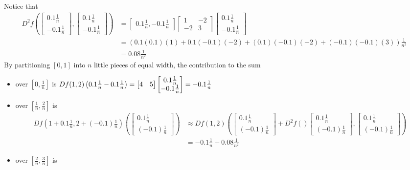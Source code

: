 \documentclass{article}
\newcommand{\verticalvector}[1]{\begin{bmatrix}#1\end{bmatrix}}
\newenvironment{question}{}{}
\newenvironment{hint}{}{}
\newenvironment{solution}{}{}
\begin{document}
\begin{question}
  \begin{solution}
    \begin{hint}
      Notice that \begin{align*}
        D^2f\left(\verticalvector{0.1\frac{1}{n}\\-0.1\frac{1}{n}},\verticalvector{0.1\frac{1}{n}\\-0.1\frac{1}{n}}\right)
        &=\begin{bmatrix} 0.1 \frac{1}{n}, -0.1\frac{1}{n}\end{bmatrix}  \begin{bmatrix} 1 & -2 \\ -2 & 3\end{bmatrix} \verticalvector{0.1\frac{1}{n}\\-0.1\frac{1}{n}}\\
        &=\left(0.1(0.1)(1)+0.1(-0.1)(-2)+(0.1)(-0.1)(-2)+(-0.1)(-0.1)(3)\right)\frac{1}{n^2}\\
        &=0.08\frac{1}{n^2}
      \end{align*}
    \end{hint}
    \begin{hint}
      By partitioning $[0,1]$ into $n$ little pieces of equal width, the contribution to the sum 
      \begin{itemize}
      \item over $[0,\frac{1}{n}]$ is \(Df(1,2)\left( 0.1\frac{1}{n} \\ -0.1\frac{1}{n}\right) = \begin{bmatrix} 4 &5\end{bmatrix} \verticalvector{0.1\frac{1}{n} \\ -0.1\frac{1}{n}} = -0.1\frac{1}{n}\)
      \item over $[\frac{1}{n}, \frac{2}{n}]$ is 
        \begin{align*}
          Df(1+0.1\frac{1}{n},2+(-0.1)\frac{1}{n})\left( \verticalvector{0.1\frac{1}{n}\\(-0.1)\frac{1}{n}} \right) 
          &\approx Df(1,2)\left( \verticalvector{0.1\frac{1}{n}\\(-0.1)\frac{1}{n}}+D^2f\left(\right)\verticalvector{0.1\frac{1}{n}\\(-0.1)\frac{1}{n}},\verticalvector{0.1\frac{1}{n}\\(-0.1)\frac{1}{n}}\right)\\
          &= -0.1\frac{1}{n} + 0.08\frac{1}{n^2}
        \end{align*}
      \item over $[\frac{2}{n},\frac{3}{n}]$ is

\end{itemize}
\end{hint}
\end{solution}
\end{question}
\end{document}
